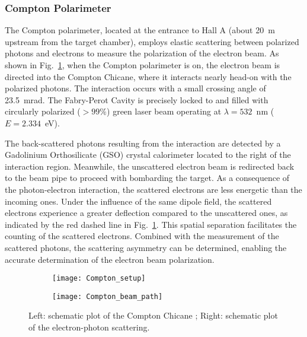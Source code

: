 \subsubsection{Compton Polarimeter}
The Compton polarimeter, located at the entrance to Hall A (about 20~m upstream from
the target chamber), employs elastic scattering between polarized photons and electrons
to measure the polarization of the electron beam. As shown in Fig.~\ref{fig:compton_pol},
when the Compton polarimeter is on, the electron beam is directed into the 
Compton Chicane, where it interacts nearly head-on with the polarized photons.
The interaction occurs with a small crossing angle of 23.5~mrad. The Fabry-Perot Cavity
is precisely locked to and filled with circularly polarized ($> 99\%$) green laser beam
operating at $\lambda = 532$~nm ($E = 2.334$~eV).

The back-scattered photons resulting from the interaction are detected by a Gadolinium Orthosilicate (GSO) 
crystal calorimeter located to the right of the interaction region. Meanwhile, the unscattered electron beam is redirected back to the beam pipe to proceed with bombarding the target.
As a consequence of the photon-electron interaction, the scattered electrons are less energetic than the incoming ones. Under the influence of the same dipole field, the scattered electrons experience a greater deflection compared to the unscattered ones, as indicated by the red dashed line in Fig.~\ref{fig:compton_pol}. This spatial separation facilitates the counting of the scattered electrons. Combined with the measurement of the scattered photons, the scattering asymmetry can be determined, enabling the accurate determination of the electron beam polarization.
\begin{figure}[!h]
    \begin{subfigure}[c]{0.55\linewidth}
	\texttt{[image: Compton\_setup]}
    \end{subfigure}
    \begin{subfigure}[c]{0.55\linewidth}
	\texttt{[image: Compton\_beam\_path]}
    \end{subfigure}
    \caption[Compton Chicane]
    {Left: schematic plot of the Compton Chicane \cite{PhysRevSTAB.7.042802}; 
    Right: schematic plot of the electron-photon scattering.} 
    \label{fig:compton_pol}
\end{figure}

